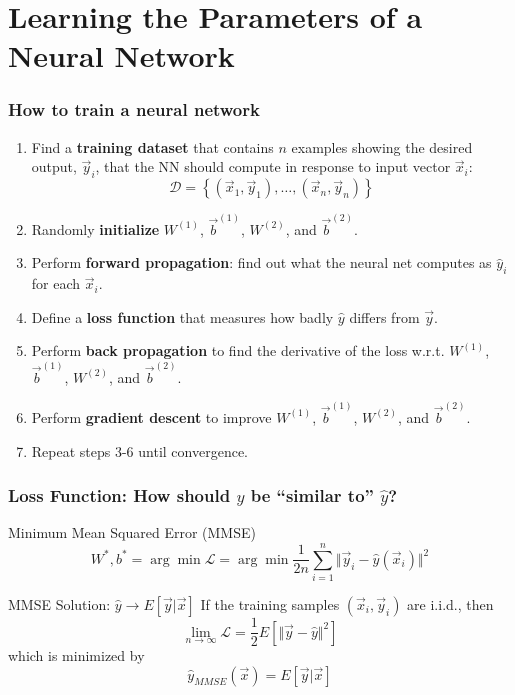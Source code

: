 \documentclass{beamer}
\begin{document}
\section[Learning]{Learning the Parameters of a Neural Network}
\setcounter{subsection}{1}

\begin{frame}
  \frametitle{How to train a neural network}
  \begin{enumerate}
  \item Find a {\bf training dataset} that contains $n$ examples showing the
    desired output, $\vec{y}_i$, that the NN should compute in
    response to input vector $\vec{x}_i$:
    \[
    {\mathcal D}=\left\{(\vec{x}_1,\vec{y}_1),\ldots,(\vec{x}_n,\vec{y}_n)\right\}
    \]
    \item Randomly {\bf initialize} $W^{(1)}$,
      $\vec{b}^{(1)}$, $W^{(2)}$, and $\vec{b}^{(2)}$.
    \item Perform {\bf forward propagation}: find out what the neural
      net computes as $\hat{y}_i$ for each $\vec{x}_i$.
    \item Define a {\bf loss function} that measures
      how badly $\hat{y}$ differs from $\vec{y}$.
    \item Perform {\bf back propagation} to find the derivative of the loss w.r.t.  $W^{(1)}$,
      $\vec{b}^{(1)}$, $W^{(2)}$, and $\vec{b}^{(2)}$.
    \item Perform {\bf gradient descent} to improve  $W^{(1)}$,
      $\vec{b}^{(1)}$, $W^{(2)}$, and $\vec{b}^{(2)}$.
    \item Repeat steps 3-6 until convergence.
  \end{enumerate}
\end{frame}

\begin{frame}
  \frametitle{Loss Function: How should $y$ be
    ``similar to'' $\hat{y}$?}
  \begin{block}{Minimum Mean Squared Error (MMSE)}
    \[
    W^*,b^*=\arg\min {\mathcal L} = \arg\min\frac{1}{2n}\sum_{i=1}^n
    \Vert\vec{y}_{i}-\hat{y}(\vec{x}_i)\Vert^2
    \]
  \end{block}
  \begin{block}{MMSE Solution: $\hat{y}\rightarrow E\left[\vec{y}|\vec{x}\right]$}
    If the training samples $(\vec{x}_i,\vec{y}_i)$ are i.i.d., then
    \[
    \lim_{n\rightarrow\infty}{\mathcal L} = \frac{1}{2}E\left[\Vert\vec{y}-\hat{y}\Vert^2\right]
    \]
    which is minimized by
    \[
    \hat{y}_{MMSE}(\vec{x})=E\left[\vec{y}|\vec{x}\right]
    \]
  \end{block}
\end{frame}
\end{document}
